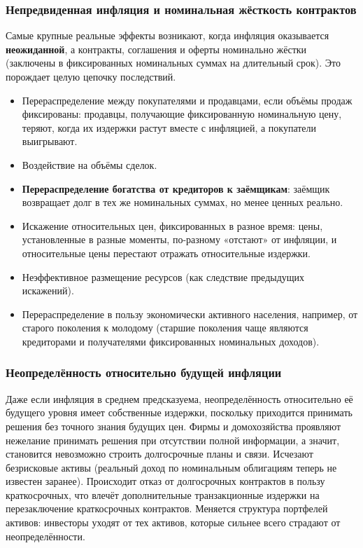 \documentclass[11pt,a4paper]{article}
\begin{document}
\subsubsection{Непредвиденная инфляция и номинальная жёсткость контрактов}

Самые крупные реальные эффекты возникают, когда инфляция оказывается \textbf{неожиданной}, а контракты, соглашения и оферты номинально жёстки (заключены в фиксированных номинальных суммах на длительный срок). Это порождает целую цепочку последствий.
\begin{itemize}[leftmargin=1.5em]
\item Перераспределение между покупателями и продавцами, если объёмы продаж фиксированы: продавцы, получающие фиксированную номинальную цену, теряют, когда их издержки растут вместе с инфляцией, а покупатели выигрывают.
\item Воздействие на объёмы сделок.
\item \textbf{Перераспределение богатства от кредиторов к заёмщикам}: заёмщик возвращает долг в тех же номинальных суммах, но менее ценных реально.
\item Искажение относительных цен, фиксированных в разное время: цены, установленные в разные моменты, по-разному «отстают» от инфляции, и относительные цены перестают отражать относительные издержки.
\item Неэффективное размещение ресурсов (как следствие предыдущих искажений).
\item Перераспределение в пользу экономически активного населения, например, от старого поколения к молодому (старшие поколения чаще являются кредиторами и получателями фиксированных номинальных доходов).
\end{itemize}

\subsubsection{Неопределённость относительно будущей инфляции}

Даже если инфляция в среднем предсказуема, неопределённость относительно её будущего уровня имеет собственные издержки, поскольку приходится принимать решения без точного знания будущих цен. Фирмы и домохозяйства проявляют нежелание принимать решения при отсутствии полной информации, а значит, становится невозможно строить долгосрочные планы и связи. Исчезают безрисковые активы (реальный доход по номинальным облигациям теперь не известен заранее). Происходит отказ от долгосрочных контрактов в пользу краткосрочных, что влечёт дополнительные транзакционные издержки на перезаключение краткосрочных контрактов. Меняется структура портфелей активов: инвесторы уходят от тех активов, которые сильнее всего страдают от неопределённости.
\end{document}
